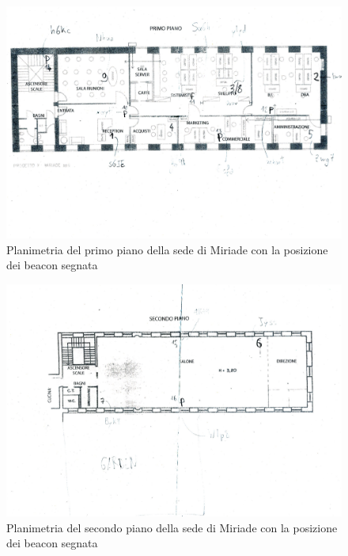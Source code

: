 		\begin{figure}[!h]
				\centering
				\includegraphics[scale=0.5]{planimetrie/Miriade1piano}
				\caption{Planimetria del primo piano della sede di Miriade con la posizione dei beacon segnata}
		\end{figure}
		\begin{figure}[!h]
				\centering
				\includegraphics[scale=0.5]{planimetrie/Miriade2piano}
				\caption{Planimetria del secondo piano della sede di Miriade con la posizione dei beacon segnata}
		\end{figure}

